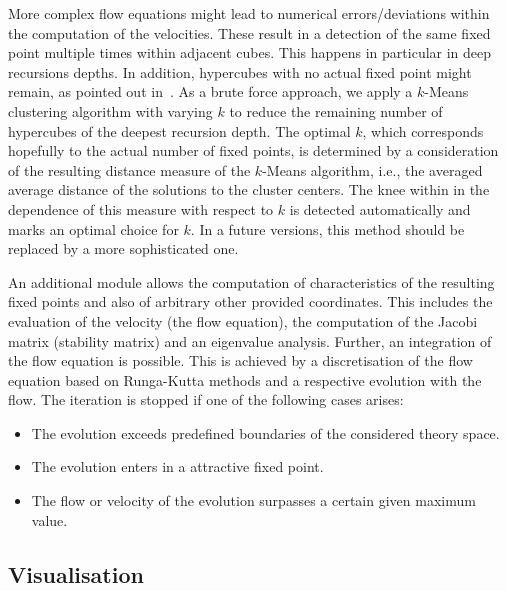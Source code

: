 \documentclass[paper=a4,11pt,bibliography=totoc]{scrartcl}
\begin{document}
More complex flow equations might lead to numerical errors/deviations within the computation of the velocities. These result in a detection of the same fixed point multiple times within adjacent cubes. This happens in particular in deep recursions depths. In addition, hypercubes with no actual fixed point might remain, as pointed out in~. As a brute force approach, we apply a $k$-Means clustering algorithm with varying $k$ to reduce the remaining number of hypercubes of the deepest recursion depth. The optimal $k$, which corresponds hopefully to the actual number of fixed points, is determined by a consideration of the resulting distance measure of the $k$-Means algorithm, i.e., the averaged average distance of the solutions to the cluster centers. The knee within in the dependence of this measure with respect to $k$ is detected automatically and marks an optimal choice for $k$. In a future versions, this method should be replaced by a more sophisticated one.

An additional module allows the computation of characteristics of the resulting fixed points and also of arbitrary other provided coordinates. This includes the evaluation of the velocity (the flow equation), the computation of the Jacobi matrix (stability matrix) and an eigenvalue analysis. Further, an integration of the flow equation is possible. This is achieved by a discretisation of the flow equation based on Runga-Kutta methods and a respective evolution with the flow. The iteration is stopped if one of the following cases arises:
%
\begin{itemize}
	\item The evolution exceeds predefined boundaries of the considered theory space.
	\item The evolution enters in a attractive fixed point.
	\item The flow or velocity of the evolution surpasses a certain given maximum value.
\end{itemize}

\subsection{Visualisation}
\end{document}
